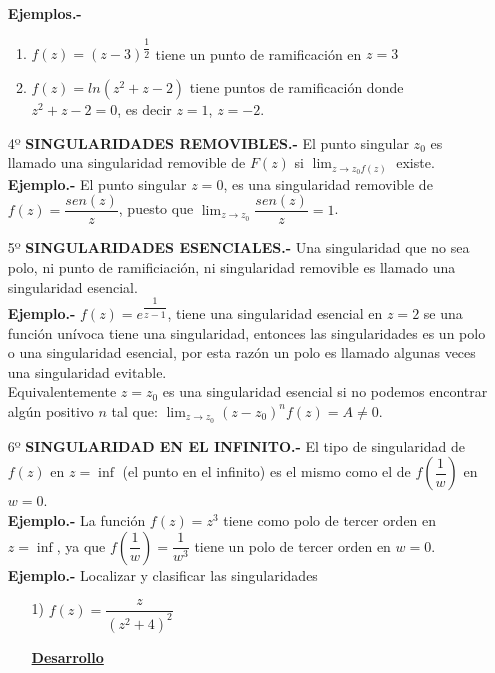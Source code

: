 \documentclass[10pt,a4paper]{article}
\begin{document}
\begin{enumerate}
\textbf{Ejemplos.-} \\
\begin{enumerate}
\item $\displaystyle{f(z) = (z-3)^{\dfrac{1}{2}}}$ tiene un punto de ramificación en $z = 3$
\item $f(z) = ln (z^2 + z -2)$ tiene puntos de ramificación donde $z^2+z-2 = 0$, es decir $z = 1$, $z = -2$. 
\end{enumerate}
\item[4º] \textbf{SINGULARIDADES REMOVIBLES.-} El punto singular $z_0$ es llamado una singularidad removible de $F(z)$ si $\lim_{z \to z_0 f(z)}$ existe.\\
\textbf{Ejemplo.-} El punto singular $z = 0$, es una singularidad removible de \\ $f(z) =\dfrac{sen(z)}{z}$, puesto que $\displaystyle{\lim_{z \to z_0} \dfrac{sen (z)}{z} = 1}$.
\item[5º] \textbf{SINGULARIDADES ESENCIALES.-} Una singularidad que no sea polo, ni punto de ramificiación, ni singularidad removible es llamado una singularidad esencial.\\
\textbf{Ejemplo.-} $f(z) = e^{\dfrac{1}{z-1}}$, tiene una singularidad esencial en $z = 2$ se una función unívoca tiene una singularidad, entonces las singularidades es un polo o una singularidad esencial, por esta razón un polo es llamado algunas veces una singularidad evitable.\\
Equivalentemente $z = z_0$ es una singularidad esencial si no podemos encontrar algún positivo $n$ tal que: $\displaystyle{\lim_{z \to z_0} (z-z_0)^n f(z) = A \neq 0}$. \\ 
\item[6º] \textbf{SINGULARIDAD EN EL INFINITO.-} El tipo de singularidad de $f(z)$ en $z = \inf$ (el punto en el infinito) es el mismo como el de $f(\dfrac{1}{w})$ en $w = 0$.\\
\textbf{Ejemplo.-} La función $f(z) = z^3$ tiene como polo de tercer orden en $z = \inf$, ya que $f(\dfrac{1}{w}) = \dfrac{1}{w^3}$ tiene un polo de tercer orden en $w = 0$.\\
\textbf{Ejemplo.-} Localizar y clasificar las singularidades\\
\begin{itemize}
\item [1)] $f(z) = \dfrac{z}{(z^2 + 4)^2}$ \\
\begin{center}
\underline{\textbf{Desarrollo}}
\end{center}

\end{itemize}
\end{enumerate}
\end{document}
